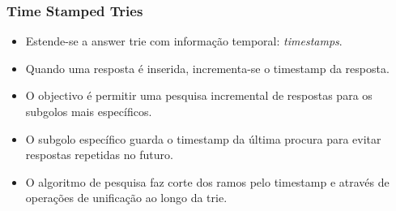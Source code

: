 \documentclass{beamer}
\begin{document}
\begin{frame}
  \frametitle{Time Stamped Tries}
  \begin{itemize}
     \item Estende-se a answer trie com informação temporal: \emph{timestamps}.
     \item Quando uma resposta é inserida, incrementa-se o timestamp da resposta.
     \item O objectivo é permitir uma pesquisa incremental de respostas para os subgolos mais específicos.
     \item O subgolo específico guarda o timestamp da última procura para evitar respostas repetidas no futuro.
     \item O algoritmo de pesquisa faz corte dos ramos pelo timestamp e através de operações de unificação ao longo da trie.
  \end{itemize}
\end{frame}
\end{document}
